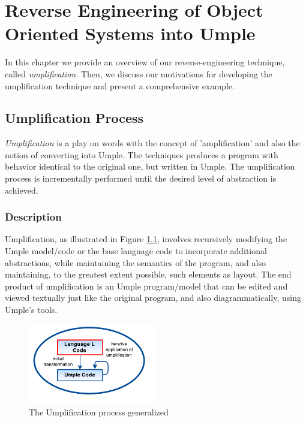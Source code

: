 \lhead{\emph{\leftmark}} 
\chapter{Reverse Engineering of Object Oriented Systems into Umple}
\label{chap:core}

In this chapter we provide an overview of our reverse-engineering technique, called \textit{umplification}. Then, we discuss our motivations for developing the umplification technique and present a comprehensive example. 

\section{Umplification Process}

\textit{Umplification} is a play on words with the concept of 'amplification' and also the notion of converting into Umple. The techniques produces a program with behavior identical to the original one, but written in Umple. The umplification process is incrementally performed until the desired level of abstraction is achieved. 

\subsection{Description}
Umplification, as illustrated in Figure \ref{fig:umplificationLoop}, involves recursively modifying the Umple model/code or the base language code to incorporate additional abstractions, while maintaining the semantics of the program, and also maintaining, to the greatest extent possible, such elements as layout. The end product of umplification is an Umple program/model that can be edited and viewed textually just like the original program, and also diagrammatically, using Umple's tools. 

\begin{figure}[h]
\centering
\includegraphics[width=0.50\textwidth]{Figures/UmplificationProcess.pdf}
\caption{The Umplification process generalized}
\label{fig:umplificationLoop}
\end{figure}

